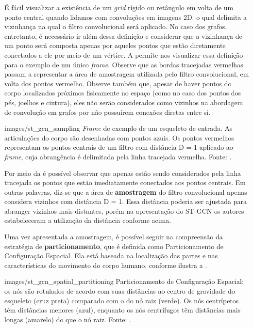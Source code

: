 É fácil visualizar a existência de um \textit{grid} rígido ou retângulo em volta de um ponto central quando lidamos com convoluções em imagens 2D. o qual delimita a vizinhança na qual o filtro convolucional será aplicado. No caso dos grafos, entretanto, é necessário ir além dessa definição e considerar que a vizinhança de um ponto será composta apenas por aqueles pontos que estão diretamente conectados a ele por meio de um vértice. A  permite-nos visualizar essa definição para o exemplo de um único \textit{frame}. Observe que as bordas tracejadas vermelhas passam a representar a área de amostragem utilizada pelo filtro convolucional, em volta dos pontos vermelho. Observe também que, apesar de haver pontos do corpo localizados próximos fisicamente no espaço (como no caso dos pontos dos pés, joelhos e cintura), eles não serão considerados como vizinhos na abordagem de convolução em grafos por não possuírem conexões diretas entre si.

    {images/st_gcn_sampling}
    {\textit{Frame} de exemplo de um esqueleto de entrada. As articulações do corpo são desenhadas com pontos azuis. Os pontos vermelhos representam os pontos centrais de um filtro com distância D = 1 aplicado ao \textit{frame}, cuja abrangência é delimitada pela linha tracejada vermelha. Fonte: \cite[p. 5]{st-gcn-2018}.}

Por meio da  é possível observar que apenas estão sendo considerados pela linha tracejada os pontos que estão imediatamente conectados aos pontos centrais. Em outras palavras, diz-se que a área de \textbf{amostragem} do filtro convolucional apenas considera vizinhos com distância D = 1. Essa distância poderia ser ajustada para abranger vizinhos mais distantes, porém na apresentação do ST-GCN \cite{st-gcn-2018} os autores estabeleceram a utilização da distância conforme acima.

Uma vez apresentada a amostragem, é possível seguir na compreensão da estratégia de \textbf{particionamento}, que é definida como Particionamento de Configuração Espacial. Ela está baseada na localização das partes e nas características do movimento do corpo humano, conforme ilustra a .

    {images/st_gcn_spatial_partitioning}
    {Particionamento de Configuração Espacial: os nós são rotulados de acordo com suas distâncias ao centro de gravidade do esqueleto (cruz preta) comparado com o do nó raiz (verde). Os nós centrípetos têm distâncias menores (azul), enquanto os nós centrífugos têm distâncias mais longas (amarelo) do que o nó raiz. Fonte: \cite[p. 5]{st-gcn-2018}.}

